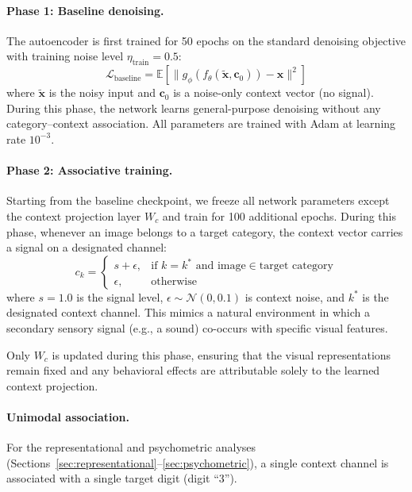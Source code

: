 \documentclass[11pt,a4paper]{article}
\begin{document}
\paragraph{Phase 1: Baseline denoising.}
The autoencoder is first trained for 50 epochs on the standard denoising objective with training noise level $\eta_\text{train} = 0.5$:
\begin{equation}
    \mathcal{L}_\text{baseline} = \mathbb{E}\left[\| g_\phi(f_\theta(\tilde{\mathbf{x}}, \mathbf{c}_0)) - \mathbf{x} \|^2\right]
\end{equation}
where $\tilde{\mathbf{x}}$ is the noisy input and $\mathbf{c}_0$ is a noise-only context vector (no signal).
During this phase, the network learns general-purpose denoising without any category--context association.
All parameters are trained with Adam \citep{kingma2015adam} at learning rate $10^{-3}$.

\paragraph{Phase 2: Associative training.}
Starting from the baseline checkpoint, we freeze all network parameters except the context projection layer $W_c$ and train for 100 additional epochs.
During this phase, whenever an image belongs to a target category, the context vector carries a signal on a designated channel:
\begin{equation}
    c_k = \begin{cases}
        s + \epsilon, & \text{if } k = k^* \text{ and image} \in \text{target category} \\
        \epsilon, & \text{otherwise}
    \end{cases}
\end{equation}
where $s = 1.0$ is the signal level, $\epsilon \sim \mathcal{N}(0, 0.1)$ is context noise, and $k^*$ is the designated context channel.
This mimics a natural environment in which a secondary sensory signal (e.g., a sound) co-occurs with specific visual features.

Only $W_c$ is updated during this phase, ensuring that the visual representations remain fixed and any behavioral effects are attributable solely to the learned context projection.

\paragraph{Unimodal association.}
For the representational and psychometric analyses (Sections~\ref{sec:representational}--\ref{sec:psychometric}), a single context channel is associated with a single target digit (digit ``3'').
\end{document}
